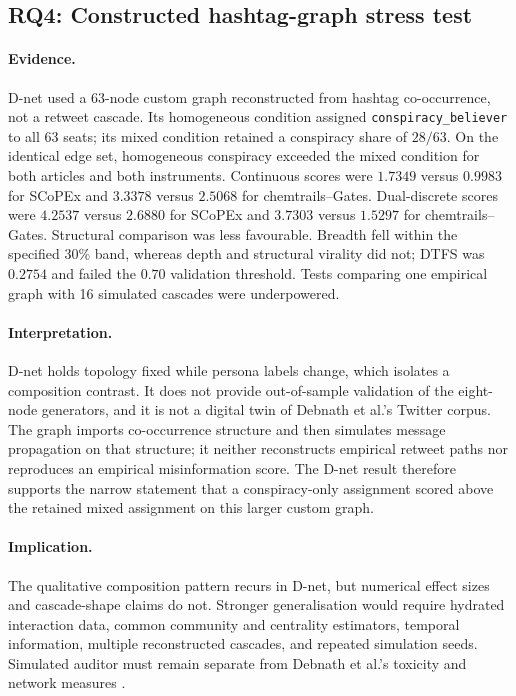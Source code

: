 \subsection{RQ4: Constructed hashtag-graph stress test}

\paragraph{Evidence.}
D-net used a 63-node custom graph reconstructed from hashtag co-occurrence,
not a retweet cascade.  Its homogeneous condition assigned
\texttt{conspiracy\_believer} to all 63 seats; its mixed condition retained a
conspiracy share of $28/63$.  On the identical edge set, homogeneous
conspiracy exceeded the mixed condition for both articles and both
instruments. Continuous scores were $1.7349$ versus $0.9983$ for SCoPEx and
$3.3378$ versus $2.5068$ for chemtrails--Gates. Dual-discrete scores were
$4.2537$ versus $2.6880$ for SCoPEx and $3.7303$ versus $1.5297$ for
chemtrails--Gates.  Structural comparison was less favourable.  Breadth fell within
the specified $30\%$ band, whereas depth and structural virality did not;
DTFS was $0.2754$ and failed the $0.70$ validation threshold.  Tests comparing
one empirical graph with 16 simulated cascades were underpowered.

\paragraph{Interpretation.}
D-net holds topology fixed while persona labels change, which isolates a
composition contrast. It does not provide
out-of-sample validation of the eight-node generators, and it is not a
digital twin of Debnath et al.'s Twitter corpus.  The graph imports
co-occurrence structure and then simulates message propagation on that
structure; it neither reconstructs empirical retweet paths nor reproduces an
empirical misinformation score.  The D-net result therefore supports the
narrow statement that a conspiracy-only assignment scored above the retained
mixed assignment on this larger custom graph.

\paragraph{Implication.}
The qualitative composition pattern recurs in
D-net, but numerical effect sizes and cascade-shape claims do not.  Stronger
generalisation would require hydrated interaction data, common community and
centrality estimators, temporal information, multiple reconstructed cascades,
and repeated simulation seeds.  Simulated auditor \MI{} must remain separate
from Debnath et al.'s toxicity and network measures
\parencite{debnath2023conspiracy,ruths2014social}.

